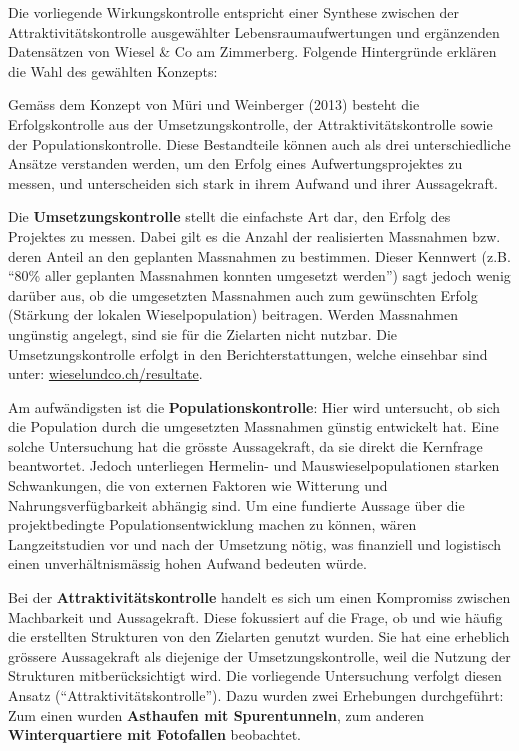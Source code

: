 \documentclass[
  oneside]{scrbook}
\begin{document}
Die vorliegende Wirkungskontrolle entspricht einer Synthese zwischen der Attraktivitätskontrolle ausgewählter Lebensraumaufwertungen und ergänzenden Datensätzen von Wiesel \& Co am Zimmerberg. Folgende Hintergründe erklären die Wahl des gewählten Konzepts:

Gemäss dem Konzept von Müri und Weinberger (2013) besteht die Erfolgskontrolle aus der Umsetzungskontrolle, der Attraktivitätskontrolle sowie der Populationskontrolle. Diese Bestandteile können auch als drei unterschiedliche Ansätze verstanden werden, um den Erfolg eines Aufwertungsprojektes zu messen, und unterscheiden sich stark in ihrem Aufwand und ihrer Aussagekraft.

Die \textbf{Umsetzungskontrolle} stellt die einfachste Art dar, den Erfolg des Projektes zu messen. Dabei gilt es die Anzahl der realisierten Massnahmen bzw. deren Anteil an den geplanten Massnahmen zu bestimmen. Dieser Kennwert (z.B. ``80\% aller geplanten Massnahmen konnten umgesetzt werden'') sagt jedoch wenig darüber aus, ob die umgesetzten Massnahmen auch zum gewünschten Erfolg (Stärkung der lokalen Wieselpopulation) beitragen. Werden Massnahmen ungünstig angelegt, sind sie für die Zielarten nicht nutzbar. Die Umsetzungskontrolle erfolgt in den Berichterstattungen, welche einsehbar sind unter: \href{https://wieselundco.ch/resultate}{wieselundco.ch/resultate}.

Am aufwändigsten ist die \textbf{Populationskontrolle}: Hier wird untersucht, ob sich die Population durch die umgesetzten Massnahmen günstig entwickelt hat. Eine solche Untersuchung hat die grösste Aussagekraft, da sie direkt die Kernfrage beantwortet. Jedoch unterliegen Hermelin- und Mauswieselpopulationen starken Schwankungen, die von externen Faktoren wie Witterung und Nahrungsverfügbarkeit abhängig sind. Um eine fundierte Aussage über die projektbedingte Populationsentwicklung machen zu können, wären Langzeitstudien vor und nach der Umsetzung nötig, was finanziell und logistisch einen unverhältnismässig hohen Aufwand bedeuten würde.

Bei der \textbf{Attraktivitätskontrolle} handelt es sich um einen Kompromiss zwischen Machbarkeit und Aussagekraft. Diese fokussiert auf die Frage, ob und wie häufig die erstellten Strukturen von den Zielarten genutzt wurden. Sie hat eine erheblich grössere Aussagekraft als diejenige der Umsetzungskontrolle, weil die Nutzung der Strukturen mitberücksichtigt wird. Die vorliegende Untersuchung verfolgt diesen Ansatz (``Attraktivitätskontrolle''). Dazu wurden zwei Erhebungen durchgeführt: Zum einen wurden \textbf{Asthaufen mit Spurentunneln}, zum anderen \textbf{Winterquartiere mit Fotofallen} beobachtet.
\end{document}
